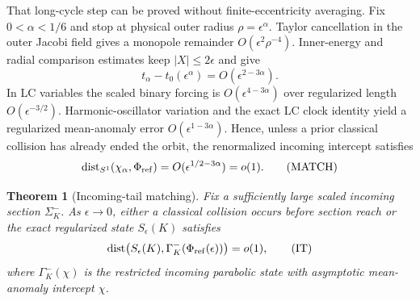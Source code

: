 \documentclass[11pt]{article}
\newtheorem{theorem}{Theorem}
\begin{document}
That long-cycle step can be proved without finite-eccentricity averaging. Fix
$0<\alpha<1/6$ and stop at physical outer radius
$\rho=\epsilon^\alpha$. Taylor cancellation in the outer Jacobi field gives a
monopole remainder $O(\epsilon^2\rho^{-4})$. Inner-energy and radial
comparison estimates keep $|X|\le2\epsilon$ and give
\[
t_\alpha-t_0(\epsilon^\alpha)=O(\epsilon^{2-3\alpha}).
\]
In LC variables the scaled binary forcing is
$O(\epsilon^{4-3\alpha})$ over regularized length
$O(\epsilon^{-3/2})$. Harmonic-oscillator variation and the exact LC clock
identity yield a regularized mean-anomaly error
$O(\epsilon^{1-3\alpha})$. Hence, unless a prior classical collision has
already ended the orbit, the renormalized incoming intercept satisfies
\[
\operatorname{dist}_{S^1}(\chi_\alpha,\Phi_{\rm ref})
=O(\epsilon^{1/2-3\alpha})=o(1).
\tag{MATCH}
\]
\begin{theorem}[Incoming-tail matching]
Fix a sufficiently large scaled incoming section $\Sigma^-_K$. As
$\epsilon\to0$, either a classical collision occurs before section reach or
the exact regularized state $S_\epsilon(K)$ satisfies
\[
\operatorname{dist}\!\left(
S_\epsilon(K),\Gamma^-_K(\Phi_{\rm ref}(\epsilon))\right)=o(1),
\tag{IT}
\]
where $\Gamma^-_K(\chi)$ is the restricted incoming parabolic state with
asymptotic mean-anomaly intercept $\chi$.
\end{theorem}
\end{document}
